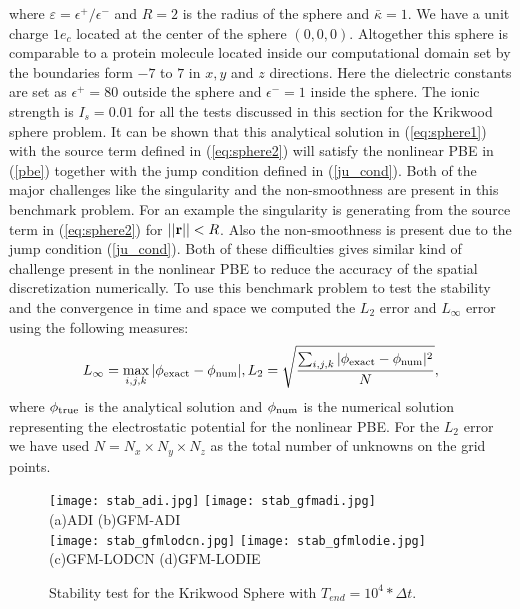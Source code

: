 where $\varepsilon=\epsilon^+ / \epsilon^-$ and $R=2$ is the radius of the sphere and $\bar{\kappa}=1$. We have a unit charge $1e_c$ located at the center of the sphere $(0,0,0)$. Altogether this sphere is comparable to a protein molecule located inside our computational domain set by the boundaries form $-7$ to $7$ in $x,y$ and $z$ directions.  Here the dielectric constants are set as $\epsilon^+=80$ outside the sphere and $\epsilon^-=1$ inside the sphere. The ionic strength is $I_s = 0.01$ for all the tests discussed in this section for the Krikwood sphere problem. It can be shown that this analytical solution in (\ref{eq:sphere1}) with the source term defined in (\ref{eq:sphere2}) will satisfy the nonlinear PBE in (\ref{pbe}) together with the jump condition defined in (\ref{ju_cond}). Both of the major challenges like the singularity and the non-smoothness are present in this benchmark problem. For an example the singularity is generating from the source term in (\ref{eq:sphere2}) for $||{\bf r}|| <R$. Also the non-smoothness is present due to the jump condition (\ref{ju_cond}). Both of these difficulties gives similar kind of challenge present in the nonlinear PBE to reduce the accuracy of the spatial discretization numerically. To use this benchmark problem to test the stability and the convergence in time and space we computed the $L_2$ error and $L_\infty$ error using the following measures: 
\begin{equation}
	L_\infty=\max\limits_{i,j,k}|\phi_{\rm exact}-\phi_{\rm num}|, L_2 = \sqrt{\frac{\sum_{i,j,k}|\phi_{\rm exact}-\phi_{\rm num}|^2}{N}},\label{eq:l2lmax}
\end{equation}
where $\phi_{\rm true}$ is the analytical solution and $\phi_{\rm num}$ is the numerical solution representing the electrostatic potential for the nonlinear PBE. For the $L_2$ error we have used $N= N_x \times N_y \times N_z$ as the total number of unknowns on the grid points. 
\begin{figure}[!ht]
	\centering
	\texttt{[image: stab\_adi.jpg]}
	\texttt{[image: stab\_gfmadi.jpg]}\\
	(a)ADI\hspace*{2.5in} (b)GFM-ADI\\ 	
	\texttt{[image: stab\_gfmlodcn.jpg]}
	\texttt{[image: stab\_gfmlodie.jpg]}\\
	(c)GFM-LODCN \hspace*{2in} (d)GFM-LODIE
	\caption{Stability test for the Krikwood Sphere with $T_{end}= 10^4*\Delta t$.}
	\label{fig:stab_krik}	
\end{figure}

